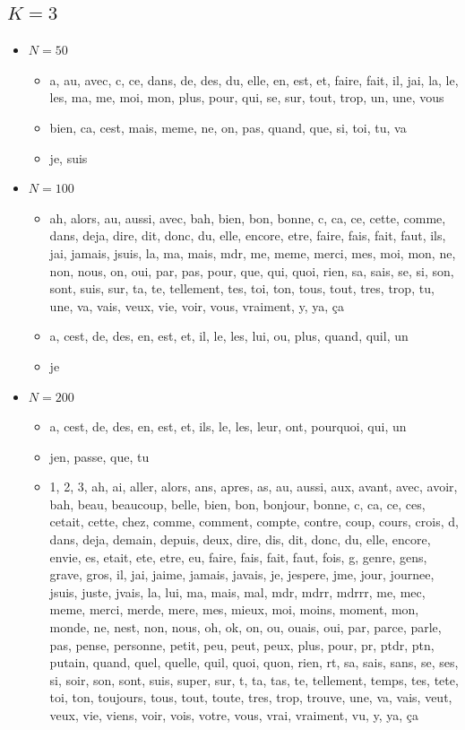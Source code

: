 \subsection*{$K=3$}

\begin{itemize}
\item $N = 50$
	\begin{itemize}
	\item a, au, avec, c, ce, dans, de, des, du, elle, en, est, et, faire, fait, il, jai, la, le, les, ma, me, moi, mon, plus, pour, qui, se, sur, tout, trop, un, une, vous
	\item bien, ca, cest, mais, meme, ne, on, pas, quand, que, si, toi, tu, va
	\item je, suis
	\end{itemize}
\item $N = 100$
	\begin{itemize}
	\item ah, alors, au, aussi, avec, bah, bien, bon, bonne, c, ca, ce, cette, comme, dans, deja, dire, dit, donc, du, elle, encore, etre, faire, fais, fait, faut, ils, jai, jamais, jsuis, la, ma, mais, mdr, me, meme, merci, mes, moi, mon, ne, non, nous, on, oui, par, pas, pour, que, qui, quoi, rien, sa, sais, se, si, son, sont, suis, sur, ta, te, tellement, tes, toi, ton, tous, tout, tres, trop, tu, une, va, vais, veux, vie, voir, vous, vraiment, y, ya, ça
	\item a, cest, de, des, en, est, et, il, le, les, lui, ou, plus, quand, quil, un
	\item je
	\end{itemize}
\item $N = 200$
 \begin{itemize}
 	\item a, cest, de, des, en, est, et, ils, le, les, leur, ont, pourquoi, qui, un
 	\item jen, passe, que, tu
 	\item 1, 2, 3, ah, ai, aller, alors, ans, apres, as, au, aussi, aux, avant, avec, avoir, bah, beau, beaucoup, belle, bien, bon, bonjour, bonne, c, ca, ce, ces, cetait, cette, chez, comme, comment, compte, contre, coup, cours, crois, d, dans, deja, demain, depuis, deux, dire, dis, dit, donc, du, elle, encore, envie, es, etait, ete, etre, eu, faire, fais, fait, faut, fois, g, genre, gens, grave, gros, il, jai, jaime, jamais, javais, je, jespere, jme, jour, journee, jsuis, juste, jvais, la, lui, ma, mais, mal, mdr, mdrr, mdrrr, me, mec, meme, merci, merde, mere, mes, mieux, moi, moins, moment, mon, monde, ne, nest, non, nous, oh, ok, on, ou, ouais, oui, par, parce, parle, pas, pense, personne, petit, peu, peut, peux, plus, pour, pr, ptdr, ptn, putain, quand, quel, quelle, quil, quoi, quon, rien, rt, sa, sais, sans, se, ses, si, soir, son, sont, suis, super, sur, t, ta, tas, te, tellement, temps, tes, tete, toi, ton, toujours, tous, tout, toute, tres, trop, trouve, une, va, vais, veut, veux, vie, viens, voir, vois, votre, vous, vrai, vraiment, vu, y, ya, ça
 \end{itemize}
\end{itemize}
